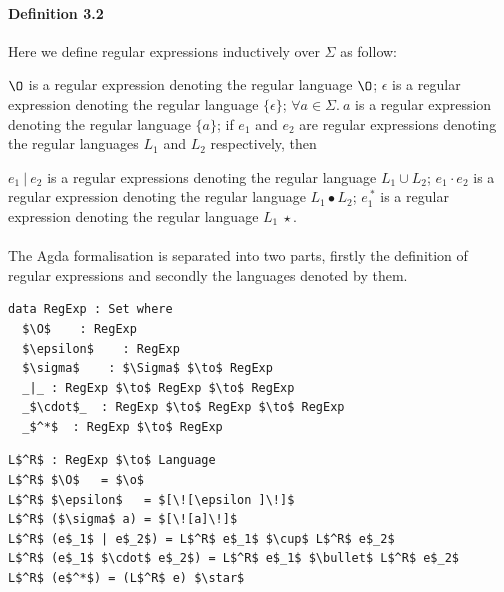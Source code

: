 \documentclass[twoside,openright,final]{bhamthesis}
\renewcommand{\item}{\itemindent0.5cm\itemold}
\begin{document}
\paragraph{Definition 3.2} Here we define regular expressions
inductively over \(\Sigma\) as follow: 
\begin{enumerate}[nolistsep]
  \item \(\O\) is a regular expression denoting the regular language \(\O\);
  \item \(\epsilon\) is a regular expression denoting the regular language \(\{\epsilon\}\);
  \item \(\forall a\in\Sigma.\ a\) is a regular expression denoting the regular language \(\{a\}\);
  \item if \(e_{1}\) and \(e_{2}\) are regular expressions denoting the regular
    languages \(L_1\) and \(L_2\) respectively, then
    \begin{enumerate}[nolistsep]
      \item \(e_{1}\ |\ e_{2}\) is a regular expressions denoting the
        regular language \(L_1 \cup L_2\);
      \item \(e_{1}\cdot e_{2}\) is a regular expression denoting the
        regular language \(L_1\bullet L_2\);
      \item \(e_{1}^{\ *}\) is a regular expression denoting the regular
        language \(L_1\ \star\).
     \end{enumerate}
\end{enumerate}
\paragraph{} The Agda formalisation is separated into two parts, firstly the
definition of regular expressions and secondly the languages denoted by
them.

\begin{lstlisting}[caption=Regular expressions,mathescape=true]
data RegExp : Set where
  $\O$    : RegExp
  $\epsilon$    : RegExp
  $\sigma$    : $\Sigma$ $\to$ RegExp
  _|_ : RegExp $\to$ RegExp $\to$ RegExp
  _$\cdot$_  : RegExp $\to$ RegExp $\to$ RegExp
  _$^*$  : RegExp $\to$ RegExp
\end{lstlisting} 

\begin{lstlisting}[caption=Languages denoted by regular expressions,mathescape=true]
L$^R$ : RegExp $\to$ Language
L$^R$ $\O$   = $\o$
L$^R$ $\epsilon$   = $[\![\epsilon ]\!]$
L$^R$ ($\sigma$ a) = $[\![a]\!]$
L$^R$ (e$_1$ | e$_2$) = L$^R$ e$_1$ $\cup$ L$^R$ e$_2$
L$^R$ (e$_1$ $\cdot$ e$_2$) = L$^R$ e$_1$ $\bullet$ L$^R$ e$_2$
L$^R$ (e$^*$) = (L$^R$ e) $\star$
\end{lstlisting}
\end{document}
